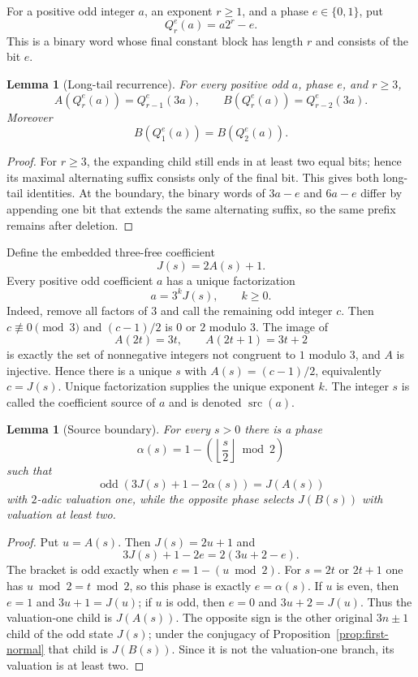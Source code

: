 \documentclass[11pt]{article}
\newtheorem{lemma}[theorem]{Lemma}
\newcommand{\odd}{\operatorname{odd}}
\newcommand{\src}{\operatorname{src}}
\begin{document}
For a positive odd integer $a$, an exponent $r\ge1$, and a phase
$e\in\{0,1\}$, put
\[
  Q_r^e(a)=a2^r-e.
\]
This is a binary word whose final constant block has length $r$ and consists
of the bit $e$.

\begin{lemma}[Long-tail recurrence]\label{lem:long-tail}
For every positive odd $a$, phase $e$, and $r\ge3$,
\[
  A(Q_r^e(a))=Q_{r-1}^e(3a),\qquad
  B(Q_r^e(a))=Q_{r-2}^e(3a).
\]
Moreover
\[
  B(Q_1^e(a))=B(Q_2^e(a)).
\]
\end{lemma}

\begin{proof}
For $r\ge3$, the expanding child still ends in at least two equal bits; hence
its maximal alternating suffix consists only of the final bit. This gives both
long-tail identities. At the boundary, the binary words of $3a-e$ and $6a-e$
differ by appending one bit that extends the same alternating suffix, so the
same prefix remains after deletion.
\end{proof}

Define the embedded three-free coefficient
\[
  J(s)=2A(s)+1.
\]
Every positive odd coefficient $a$ has a unique factorization
\[
  a=3^kJ(s),\qquad k\ge0.
\]
Indeed, remove all factors of $3$ and call the remaining odd integer $c$.
Then $c\not\equiv0\pmod3$ and $(c-1)/2$ is $0$ or $2$ modulo $3$.
The image of
\[
 A(2t)=3t,\qquad A(2t+1)=3t+2
\]
is exactly the set of nonnegative integers not congruent to $1$ modulo $3$,
and $A$ is injective. Hence there is a unique $s$ with
$A(s)=(c-1)/2$, equivalently $c=J(s)$. Unique factorization supplies the
unique exponent $k$. The integer $s$ is called the coefficient source of
$a$ and is denoted $\src(a)$.

\begin{lemma}[Source boundary]\label{lem:source-boundary}
For every $s>0$ there is a phase
\[
  \alpha(s)=1-\left(\left\lfloor\frac{s}{2}\right\rfloor\bmod2\right)
\]
such that
\[
  \odd(3J(s)+1-2\alpha(s))=J(A(s))
\]
with $2$-adic valuation one, while the opposite phase selects $J(B(s))$ with
valuation at least two.
\end{lemma}

\begin{proof}
Put $u=A(s)$. Then $J(s)=2u+1$ and
\[
  3J(s)+1-2e=2(3u+2-e).
\]
The bracket is odd exactly when $e=1-(u\bmod2)$. For $s=2t$ or $2t+1$ one
has $u\bmod2=t\bmod2$, so this phase is exactly $e=\alpha(s)$. If $u$ is
even, then $e=1$ and $3u+1=J(u)$; if $u$ is odd, then $e=0$ and
$3u+2=J(u)$. Thus the valuation-one child is $J(A(s))$. The opposite sign is
the other original $3n\pm1$ child of the odd state $J(s)$; under the
conjugacy of Proposition~\ref{prop:first-normal} that child is $J(B(s))$.
Since it is not the valuation-one branch, its valuation is at least two.
\end{proof}
\end{document}
